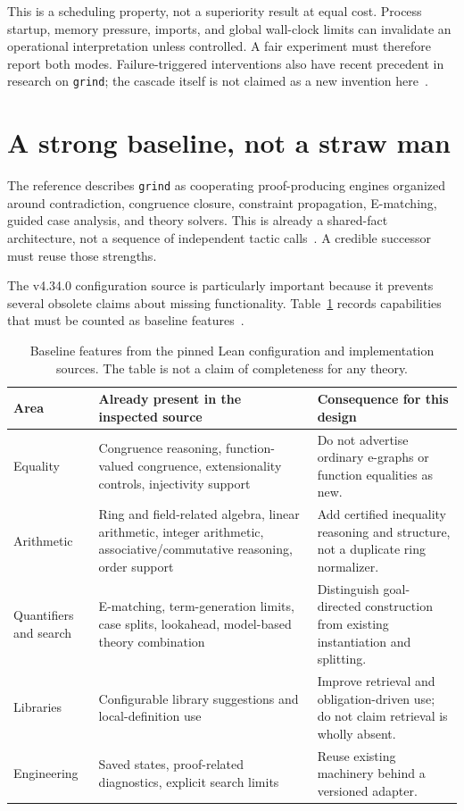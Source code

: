 \documentclass[11pt,a4paper]{article}
\theoremstyle{definition}
\newcommand{\grind}{\texttt{grind}}
\begin{document}
This is a scheduling property, not a superiority result at equal cost. Process startup, memory pressure, imports, and global wall-clock limits can invalidate an operational interpretation unless controlled. A fair experiment must therefore report both modes. Failure-triggered interventions also have recent precedent in research on \grind{}; the cascade itself is not claimed as a new invention here~\cite{learned}.

\section{A strong baseline, not a straw man}

The reference describes \grind{} as cooperating proof-producing engines organized around contradiction, congruence closure, constraint propagation, E-matching, guided case analysis, and theory solvers. This is already a shared-fact architecture, not a sequence of independent tactic calls~\cite{grindref}. A credible successor must reuse those strengths.

The v4.34.0 configuration source is particularly important because it prevents several obsolete claims about missing functionality. Table~\ref{tab:baseline} records capabilities that must be counted as baseline features~\cite{grindconfig,grindtypes}.

\begin{table}[htbp]
\centering\small
\begin{tabularx}{\textwidth}{@{}p{}Xp{}@{}}
\toprule
Area & Already present in the inspected source & Consequence for this design \\
\midrule
Equality & Congruence reasoning, function-valued congruence, extensionality controls, injectivity support & Do not advertise ordinary e-graphs or function equalities as new. \\
Arithmetic & Ring and field-related algebra, linear arithmetic, integer arithmetic, associative/commutative reasoning, order support & Add certified inequality reasoning and structure, not a duplicate ring normalizer. \\
Quantifiers and search & E-matching, term-generation limits, case splits, lookahead, model-based theory combination & Distinguish goal-directed construction from existing instantiation and splitting. \\
Libraries & Configurable library suggestions and local-definition use & Improve retrieval and obligation-driven use; do not claim retrieval is wholly absent. \\
Engineering & Saved states, proof-related diagnostics, explicit search limits & Reuse existing machinery behind a versioned adapter. \\
\bottomrule
\end{tabularx}
\caption{Baseline features from the pinned Lean configuration and implementation sources. The table is not a claim of completeness for any theory.}
\label{tab:baseline}
\end{table}
\end{document}
